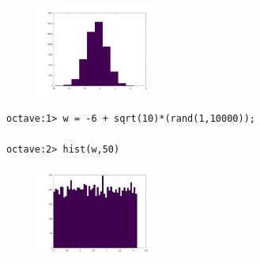 \documentclass[12pt]{report}
\begin{document}
\begin{figure}[h]
	\includegraphics[width=4cm, height=3cm]{hist.png}
\end{figure}

\begin{lstlisting}[basicstyle=\small]
octave:1> w = -6 + sqrt(10)*(rand(1,10000));

octave:2> hist(w,50)
\end{lstlisting}

\begin{figure}[h]
	\includegraphics[width=4cm, height=3cm]{hist2.png}
\end{figure}
\end{document}
